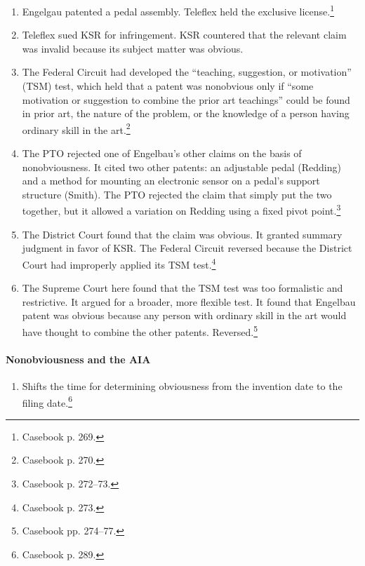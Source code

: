 \begin{enumerate}
    \item Engelgau patented a pedal assembly. Teleflex held the exclusive 
    license.\footnote{Casebook p. 269.}
    \item Teleflex sued KSR for infringement. KSR countered that the relevant 
    claim was invalid because its subject matter was obvious.
    \item The Federal Circuit had developed the ``teaching, suggestion, or 
    motivation'' (TSM) test, which held that a patent was nonobvious only if 
    ``some motivation or suggestion to combine the prior art teachings'' could 
    be found in prior art, the nature of the problem, or the knowledge of a 
    person having ordinary skill in the art.\footnote{Casebook p. 270.}
    \item The PTO rejected one of Engelbau's other claims on the basis of 
    nonobviousness. It cited two other patents: an adjustable pedal (Redding) 
    and a method for mounting an electronic sensor on a pedal's support 
    structure (Smith). The PTO rejected the claim that simply put the two 
    together, but it allowed a variation on Redding using a fixed pivot 
    point.\footnote{Casebook p. 272--73.}
    \item The District Court found that the claim was obvious. It granted 
    summary judgment in favor of KSR. The Federal Circuit reversed because the 
    District Court had improperly applied its TSM test.\footnote{Casebook p. 
    273.}
    \item The Supreme Court here found that the TSM test was too formalistic and 
    restrictive. It argued for a broader, more flexible test. It found that 
    Engelbau patent was obvious because any person with ordinary skill in the 
    art would have thought to combine the other patents. 
    Reversed.\footnote{Casebook pp. 274--77.}
\end{enumerate}

\paragraph{Nonobviousness and the AIA}

\begin{enumerate}
    \item Shifts the time for determining obviousness from the invention date 
    to the filing date.\footnote{Casebook p. 289.}
\end{enumerate}

